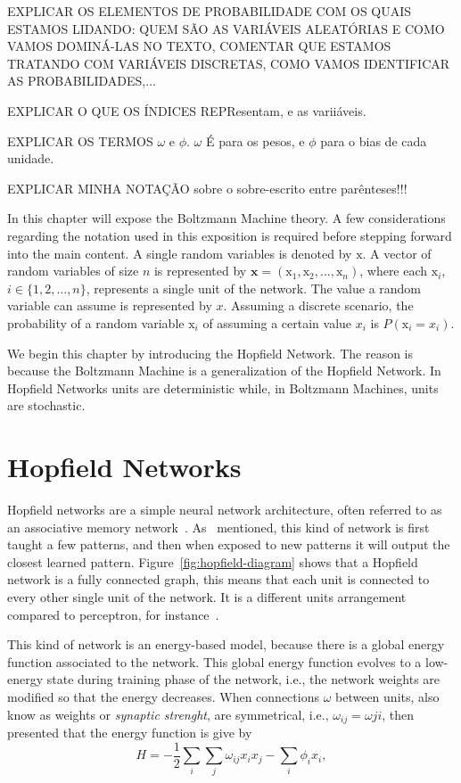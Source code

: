 EXPLICAR OS ELEMENTOS DE PROBABILIDADE COM OS QUAIS ESTAMOS LIDANDO:%
QUEM S\~{A}O AS VARI\'{A}VEIS ALEAT\'{O}RIAS E COMO VAMOS DOMIN\'{A}-LAS NO TEXTO,
COMENTAR QUE ESTAMOS TRATANDO COM VARI\'{A}VEIS DISCRETAS, COMO VAMOS IDENTIFICAR AS PROBABILIDADES,$\ldots$

EXPLICAR O QUE OS \'{I}NDICES REPResentam, e as varii\'{a}veis.

EXPLICAR OS TERMOS $\omega$ e $\phi$. $\omega$ \'{E} para os pesos, e $\phi$ para o bias de cada unidade.

EXPLICAR MINHA NOTA\c{C}\~{A}O sobre o sobre-escrito entre par\^{e}nteses!!!


In this chapter will expose the Boltzmann Machine theory. 
A few considerations regarding the notation used in this exposition is required before stepping forward into the main content. 
A single random variables is denoted by $\mathrm{x}$.
A vector of random variables of size $n$ is represented by $\mathrm{\mathbf{x}} = (\mathrm{x}_{1}, \mathrm{x}_{2}, \dots, \mathrm{x}_{n})$, where each $\mathrm{x}_{i}$, $i \in \{1, 2, \dots, n\}$, represents a single unit of the network. 
The value a random variable can assume is represented by $x$. 
Assuming a discrete scenario, the probability of a random variable $\mathrm{x}_{i}$ of assuming a certain value $x_{i}$ is $P(\mathrm{x}_{i} = x_{i})$. 

We begin this chapter by introducing the Hopfield Network. The reason is because the Boltzmann Machine is a generalization of the Hopfield Network. In Hopfield Networks units are deterministic while, in Boltzmann Machines, units are stochastic. 


\section{Hopfield Networks}

Hopfield networks are a simple neural network architecture, often referred to as an associative memory network~\cite{bib:hertz1991}. As~\cite{bib:geron2017} mentioned, this kind of network is first taught a few patterns, and then when exposed to new patterns it will output the closest learned pattern. Figure~\ref{fig:hopfield-diagram} shows that a Hopfield network is a fully connected graph, this means that each unit is connected to every other single unit of the network. It is a different units arrangement compared to perceptron, for instance~\cite{bib:hopfield1982}.


This kind of network is an energy-based model, because there is a global energy function associated to the network. This global energy function evolves to a low-energy state during training phase of the network, i.e., the network weights are modified so that the energy decreases. When connections $\omega$ between units, also know as weights or \textit{synaptic strenght}, are symmetrical, i.e., $\omega_{ij} = \omega{ji}$, then~\cite{bib:hopfield1982} presented that the energy function is give by
\begin{equation}\label{eq:hopfield-energy}
  H = -\frac{1}{2}\sum_{i} \sum_{j} \omega_{ij} x_{i} x_{j} - \sum_{i} \phi_{i} x_{i},
\end{equation}

